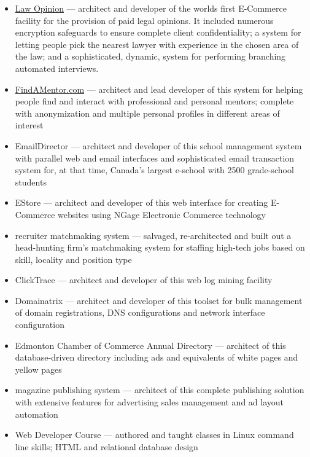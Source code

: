 \documentclass[line,margin,hidelinks]{res}
\begin{document}
\begin{resume}
\begin{position}
\begin{itemize}
\item \href{https://web.archive.org/web/19991205174419/http://www.lawopinion.com/}{Law Opinion}
   --- architect and developer of the worlds first E-Commerce facility for
       the provision of paid legal opinions.
       It included numerous encryption safeguards
       to ensure complete client confidentiality; a
       system for letting people pick the nearest
       lawyer with experience in the chosen area of
       the law;  and a sophisticated, dynamic,
       system for performing branching automated interviews.
\item \href{http://findamentor.com/}{FindAMentor.com}
   --- architect and lead developer of this system
       for helping people find and interact with professional and
       personal mentors; complete with anonymization and
       multiple personal profiles in different areas of interest
\item EmailDirector
   --- architect and developer of this school management
       system with parallel web and email interfaces
       and sophisticated email transaction system for,
       at that time, Canada's largest e-school
       with 2500 grade-school students
\item EStore
   --- architect and developer of this web interface for creating E-Commerce
       websites using NGage Electronic Commerce technology
\item recruiter matchmaking system
   --- salvaged, re-architected and built out a head-hunting firm's
       matchmaking system for staffing high-tech jobs based on skill, locality
       and position type
\item ClickTrace --- architect and developer of this web log mining facility
\item Domainatrix --- architect and developer of this
                      toolset for bulk management of domain registrations,
                      DNS configurations and network interface
                      configuration
\item Edmonton Chamber of Commerce Annual Directory ---
         architect of this database-driven directory
         including ads and equivalents of white pages and yellow pages
\item magazine publishing system ---
  architect of this complete publishing solution
  with extensive features for advertising sales management and ad layout
  automation
\item Web Developer Course ---
  authored and taught classes in Linux
  command line skills; HTML and relational database design


\end{itemize}
\end{position}
\end{resume}
\end{document}
